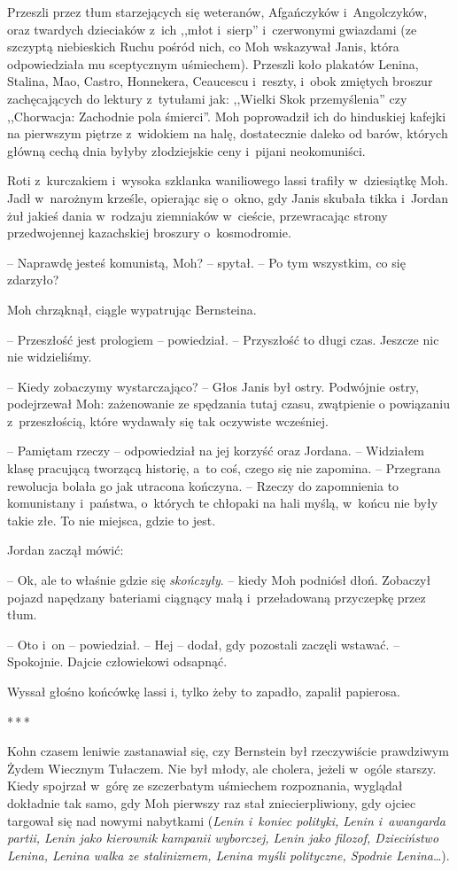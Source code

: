 \documentclass[oneside,polish,11pt,sfheadings]{mwbk}
\newcommand{\threeast}{\bigskip\par\centerline{*\,*\,*}\medskip\par}%
\begin{document}
Przeszli przez tłum starzejących się weteranów, Afgańczyków i~Angolczyków, oraz twardych dzieciaków z~ich ,,młot i~sierp'' i~czerwonymi
gwiazdami (ze szczyptą niebieskich Ruchu pośród nich, co Moh wskazywał
Janis, która odpowiedziała mu sceptycznym uśmiechem). Przeszli koło
plakatów Lenina, Stalina, Mao, Castro, Honnekera, Ceaucescu i~reszty, i~obok zmiętych broszur zachęcających do lektury z~tytułami jak: ,,Wielki
Skok przemyślenia'' czy ,,Chorwacja: Zachodnie pola śmierci''. Moh
poprowadził ich do hinduskiej kafejki na pierwszym piętrze z~widokiem na
halę, dostatecznie daleko od barów, których główną cechą dnia byłyby
złodziejskie ceny i~pijani neokomuniści.

Roti z~kurczakiem i~wysoka szklanka waniliowego lassi trafiły w~dziesiątkę Moh. Jadł w~narożnym krześle, opierając się o~okno, gdy Janis
skubała tikka i~Jordan żuł jakieś dania w~rodzaju ziemniaków w~cieście,
przewracając strony przedwojennej kazachskiej broszury o~kosmodromie.

-- Naprawdę jesteś komunistą, Moh? -- spytał. -- Po tym wszystkim, co się
zdarzyło?

Moh chrząknął, ciągle wypatrując Bernsteina. 

-- Przeszłość jest prologiem
-- powiedział. -- Przyszłość to długi czas. Jeszcze nic nie widzieliśmy.

-- Kiedy zobaczymy wystarczająco? -- Głos Janis był ostry. Podwójnie
ostry, podejrzewał Moh: zażenowanie ze spędzania tutaj czasu, zwątpienie
o powiązaniu z~przeszłością, które wydawały się tak oczywiste wcześniej.

-- Pamiętam rzeczy -- odpowiedział na jej korzyść oraz Jordana. -- Widziałem klasę pracującą tworzącą historię, a~to coś, czego się nie
zapomina. -- Przegrana rewolucja bolała go jak utracona kończyna. -- Rzeczy do zapomnienia to komunistany i~państwa, o~których te chłopaki na
hali myślą, w~końcu nie były takie złe. To nie miejsca, gdzie to jest.

Jordan zaczął mówić: 

-- Ok, ale to właśnie gdzie się \emph{skończyły}. -- kiedy Moh podniósł dłoń. Zobaczył pojazd napędzany bateriami ciągnący
małą i~przeładowaną przyczepkę przez tłum.

-- Oto i~on -- powiedział. -- Hej -- dodał, gdy pozostali zaczęli wstawać. -- Spokojnie. Dajcie człowiekowi odsapnąć.

Wyssał głośno końcówkę lassi i, tylko żeby to zapadło, zapalił
papierosa.
  \threeast 

Kohn czasem leniwie zastanawiał się, czy Bernstein był rzeczywiście
prawdziwym Żydem Wiecznym Tułaczem. Nie był młody, ale cholera, jeżeli w~ogóle starszy. Kiedy spojrzał w~górę ze szczerbatym uśmiechem
rozpoznania, wyglądał dokładnie tak samo, gdy Moh pierwszy raz stał
zniecierpliwiony, gdy ojciec targował się nad nowymi nabytkami
(\emph{Lenin i~koniec polityki, Lenin i~awangarda partii, Lenin jako
kierownik kampanii wyborczej, Lenin jako filozof, Dzieciństwo Lenina,
Lenina walka ze stalinizmem, Lenina myśli polityczne, Spodnie
Lenina}\ldots).
\end{document}
